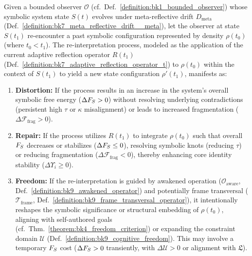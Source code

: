 \begin{proposition}
\label{proposition:bk9_modes_of_re_interpretation}
Given a bounded observer $\mathcal{O}$ (cf.~Def.~\ref{definition:bk1_bounded_observer}) whose symbolic system state $S(t)$ evolves under meta-reflective drift $D_{\text{meta}}$ (Def.~\ref{definition:bk7_meta_reflective_drift__meta}), let the observer at state $S(t_1)$ re-encounter a past symbolic configuration represented by density $\rho(t_0)$ (where $t_0 < t_1$). The re-interpretation process, modeled as the application of the current adaptive reflection operator $R(t_1)$ (Def.~\ref{definition:bk7_adaptive_reflection_operator_t}) to $\rho(t_0)$ within the context of $S(t_1)$ to yield a new state configuration $\rho'(t_1)$, manifests as:
\begin{enumerate}
    \item \textbf{Distortion:} If the process results in an increase in the system's overall symbolic free energy ($\Delta F_S > 0$) without resolving underlying contradictions (persistent high $\tau$ or $\kappa$ misalignment) or leads to increased fragmentation ($\Delta \mathcal{F}_{\text{frag}} > 0$).
    \item \textbf{Repair:} If the process utilizes $R(t_1)$ to integrate $\rho(t_0)$ such that overall $F_S$ decreases or stabilizes ($\Delta F_S \le 0$), resolving symbolic knots (reducing $\tau$) or reducing fragmentation ($\Delta \mathcal{F}_{\text{frag}} < 0$), thereby enhancing core identity stability ($\Delta \Upsilon_i \ge 0$).
    \item \textbf{Freedom:} If the re-interpretation is guided by awakened operation ($\mathcal{O}_{\text{aware}}$, Def.~\ref{definition:bk9_awakened_operator}) and potentially frame transversal ($\mathcal{T}_{\text{frame}}$, Def.~\ref{definition:bk9_frame_transversal_operator}), it intentionally reshapes the symbolic significance or structural embedding of $\rho(t_0)$, aligning with self-authored goals (cf.~Thm.~\ref{theorem:bk4_freedom_criterion}) or expanding the constraint domain $\mathcal{U}$ (Def.~\ref{definition:bk9_cognitive_freedom}). This may involve a temporary $F_S$ cost ($\Delta F_S > 0$ transiently, with $\Delta \mathcal{U} > 0$ or alignment with $\mathfrak{L}$).
\end{enumerate}
\end{proposition}
